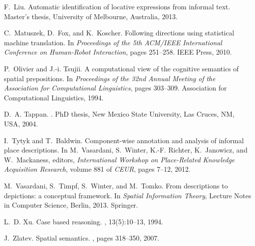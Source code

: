 \documentclass{acm_proc_article-sp}
\begin{document}
\begin{thebibliography}{10}
F.~Liu.
\newblock Automatic identification of locative expressions from informal text.
\newblock Master's thesis, University of Melbourne, Australia, 2013.

C.~Matuszek, D.~Fox, and K.~Koscher.
\newblock Following directions using statistical machine translation.
\newblock In {\em Proceedings of the 5th ACM/IEEE International Conference on
  Human-Robot Interaction}, pages 251--258. IEEE Press, 2010.

P.~Olivier and J.-i. Tsujii.
\newblock A computational view of the cognitive semantics of spatial
  prepositions.
\newblock In {\em Proceedings of the 32nd Annual Meeting of the Association for
  Computational Linguistics}, pages 303--309. Association for Computational
  Linguistics, 1994.

D.~A. Tappan.
.
\newblock PhD thesis, New Mexico State University, Las Cruces, NM, USA, 2004.

I.~Tytyk and T.~Baldwin.
\newblock Component-wise annotation and analysis of informal place
  descriptions.
\newblock In M.~Vasardani, S.~Winter, K.-F. Richter, K.~Janowicz, and
  W.~Mackaness, editors, {\em International Workshop on Place-Related Knowledge
  Acquisition Research}, volume 881 of {\em CEUR}, pages 7--12, 2012.

M.~Vasardani, S.~Timpf, S.~Winter, and M.~Tomko.
\newblock From descriptions to depictions: a conceptual framework.
\newblock In {\em Spatial Information Theory}, Lecture Notes in Computer
  Science, Berlin, 2013. Springer.

L.~D. Xu.
\newblock Case based reasoning.
, 13(5):10--13, 1994.

J.~Zlatev.
\newblock Spatial semantics.
, pages 318--350, 2007.

\end{thebibliography}

\end{document}
